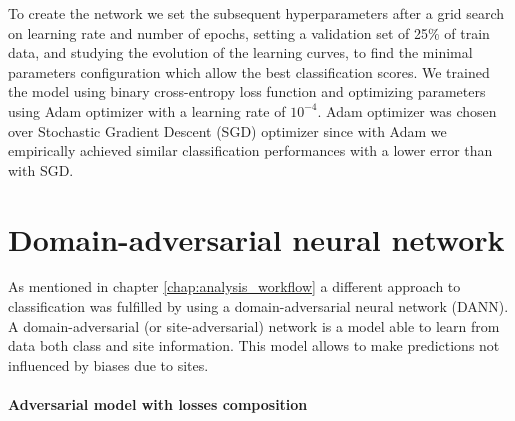 \documentclass[11pt]{report}
\begin{document}
To create the network we set the subsequent hyperparameters after a grid search on learning rate and number of epochs, setting a validation set of 25\% of train data, and studying the evolution of the learning curves, to find the minimal parameters configuration which allow the best classification scores.
We trained the model using binary cross-entropy loss function and optimizing parameters using Adam optimizer with a learning rate of $10^{-4}$.
Adam optimizer was chosen over Stochastic Gradient Descent (SGD) optimizer since with Adam we empirically achieved similar classification performances with a lower error than with SGD.

\newpage
\section{Domain-adversarial neural network}\hfill

As mentioned in chapter \ref{chap:analysis_workflow} a different approach to classification was fulfilled by using a domain-adversarial neural network (DANN).
A domain-adversarial (or site-adversarial) network is a model able to learn from data both class and site information.
This model allows to make predictions not influenced by biases due to sites.


\paragraph{Adversarial model with losses composition}\hfill
\end{document}
